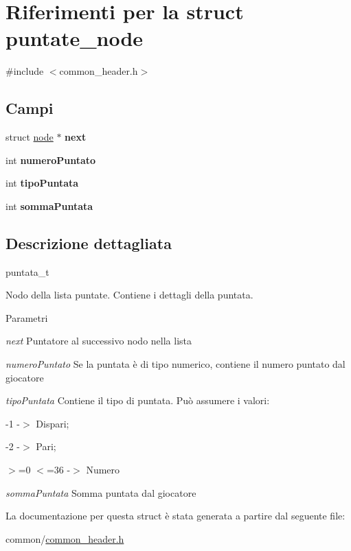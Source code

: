 \hypertarget{structpuntate__node}{
\section{Riferimenti per la struct puntate\_\-node}
\label{structpuntate__node}
}


{\ttfamily \#include $<$common\_\-header.h$>$}

\subsection*{Campi}
\begin{DoxyCompactItemize}
\item 
\hypertarget{structpuntate__node_a84cf85254ed00cb71dc354b37a575574}{
struct \hyperlink{structnode__tag}{node} $\ast$ {\bfseries next}}
\label{structpuntate__node_a84cf85254ed00cb71dc354b37a575574}

\item 
\hypertarget{structpuntate__node_a45950451963cb96dcd5ace153695747c}{
int {\bfseries numeroPuntato}}
\label{structpuntate__node_a45950451963cb96dcd5ace153695747c}

\item 
\hypertarget{structpuntate__node_ab30149e55eb9f28f2420a368a1dc6d43}{
int {\bfseries tipoPuntata}}
\label{structpuntate__node_ab30149e55eb9f28f2420a368a1dc6d43}

\item 
\hypertarget{structpuntate__node_a873560fb24674f10db457f0f5fafa570}{
int {\bfseries sommaPuntata}}
\label{structpuntate__node_a873560fb24674f10db457f0f5fafa570}

\end{DoxyCompactItemize}


\subsection{Descrizione dettagliata}
puntata\_\-t

Nodo della lista puntate. Contiene i dettagli della puntata. 
\begin{DoxyParams}{Parametri}
\item[{\em next}]Puntatore al successivo nodo nella lista \item[{\em numeroPuntato}]Se la puntata è di tipo numerico, contiene il numero puntato dal giocatore \item[{\em tipoPuntata}]Contiene il tipo di puntata. Può assumere i valori:
\begin{DoxyItemize}
\item -\/1 -\/$>$ Dispari;
\item -\/2 -\/$>$ Pari;
\item $>$=0 $<$=36 -\/$>$ Numero 
\end{DoxyItemize}\item[{\em sommaPuntata}]Somma puntata dal giocatore \end{DoxyParams}


La documentazione per questa struct è stata generata a partire dal seguente file:\begin{DoxyCompactItemize}
\item 
common/\hyperlink{common__header_8h}{common\_\-header.h}\end{DoxyCompactItemize}
